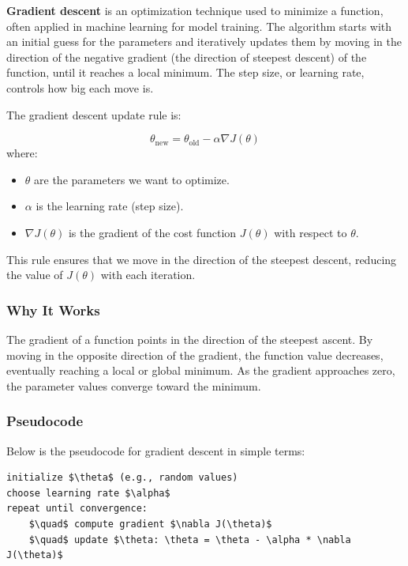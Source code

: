 \documentclass[letterpaper,12pt,notitlepage,twoside]{report}
\begin{document}
\textbf{Gradient descent} is an optimization technique used to minimize a function, often applied in machine learning for model training. The algorithm starts with an initial guess for the parameters and iteratively updates them by moving in the direction of the negative gradient (the direction of steepest descent) of the function, until it reaches a local minimum. The step size, or learning rate, controls how big each move is.

The gradient descent update rule is:

\[
\theta_{\text{new}} = \theta_{\text{old}} - \alpha \nabla J(\theta)
\]
where:
\begin{itemize}
    \item \( \theta \) are the parameters we want to optimize.
    \item \( \alpha \) is the learning rate (step size).
    \item \( \nabla J(\theta) \) is the gradient of the cost function \( J(\theta) \) with respect to \( \theta \).
\end{itemize}
This rule ensures that we move in the direction of the steepest descent, reducing the value of \( J(\theta) \) with each iteration.

\subsubsection{Why It Works}
The gradient of a function points in the direction of the steepest ascent. By moving in the opposite direction of the gradient, the function value decreases, eventually reaching a local or global minimum. As the gradient approaches zero, the parameter values converge toward the minimum.

\subsubsection{Pseudocode}
Below is the pseudocode for gradient descent in simple terms:

\begin{lstlisting}
initialize $\theta$ (e.g., random values) 
choose learning rate $\alpha$
repeat until convergence:
    $\quad$ compute gradient $\nabla J(\theta)$
    $\quad$ update $\theta: \theta = \theta - \alpha * \nabla J(\theta)$
\end{lstlisting}
\end{document}
